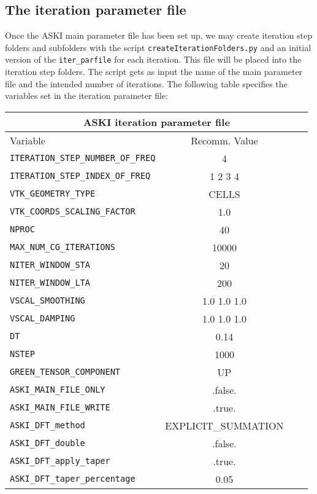 \subsection{The iteration parameter file}
%
Once the ASKI main parameter file has been set up, we may create iteration step folders and subfolders with the script \verb+createIterationFolders.py+ and an initial version of the \verb+iter_parfile+ for each iteration. This file will be placed into the iteration step folders. The script gets as input the name of the main parameter file and the intended number of iterations. The following table specifies the variables set in the iteration parameter file:
%
\begin{longtable}{|p{8.0cm}|c|c|c|}\hline
	\multicolumn{4}{|c|}{ASKI iteration parameter file} \\ \hline
	Variable & Recomm. Value \\ \hline
	\verb+ITERATION_STEP_NUMBER_OF_FREQ+ &    4               \\ \hline
	\verb+ITERATION_STEP_INDEX_OF_FREQ+  &    1 2 3 4         \\ \hline
	\verb+VTK_GEOMETRY_TYPE+             &    CELLS           \\ \hline
   \verb+VTK_COORDS_SCALING_FACTOR+     &    1.0             \\ \hline
   \verb+NPROC+                         &    40              \\ \hline
   \verb+MAX_NUM_CG_ITERATIONS+         &   10000            \\ \hline
   \verb+NITER_WINDOW_STA+              &   20               \\ \hline
   \verb+NITER_WINDOW_LTA+              &   200              \\ \hline
   \verb+VSCAL_SMOOTHING+               &   1.0 1.0 1.0      \\ \hline
   \verb+VSCAL_DAMPING+                 &   1.0 1.0 1.0      \\ \hline
   \verb+DT+                            &   0.14             \\ \hline
   \verb+NSTEP+                         &   1000             \\ \hline
   \verb+GREEN_TENSOR_COMPONENT+        &   UP               \\ \hline
   \verb+ASKI_MAIN_FILE_ONLY+           &   .false.          \\ \hline
   \verb+ASKI_MAIN_FILE_WRITE+          &   .true.           \\ \hline
   \verb+ASKI_DFT_method+               &   EXPLICIT\_SUMMATION \\ \hline
   \verb+ASKI_DFT_double+               &   .false.          \\ \hline
   \verb+ASKI_DFT_apply_taper+          &   .true.           \\ \hline
   \verb+ASKI_DFT_taper_percentage+     &   0.05             \\ \hline
\end{longtable}
